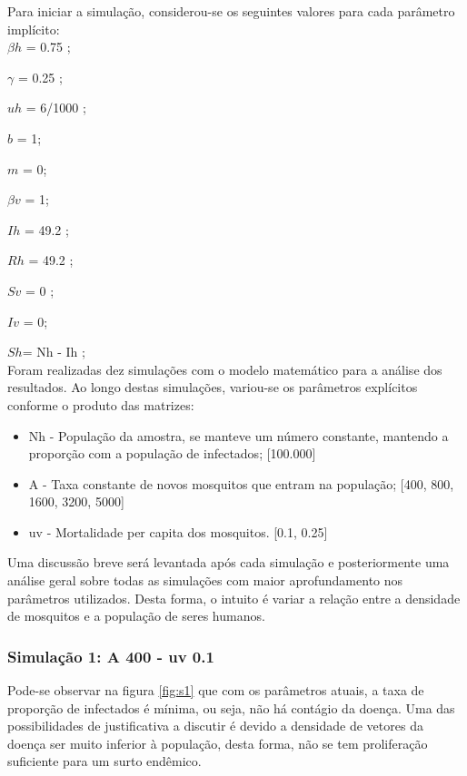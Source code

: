 \documentclass[conference]{IEEEtran}
\begin{document}
Para iniciar a simulação, considerou-se os seguintes valores para cada parâmetro implícito:\\

$ \beta h $ = 0.75 ;

$
 \gamma$ = 0.25 ;
 
$
uh $ = 6/1000 ;

$b$ = 1;

$ m$ = 0;

$ \beta v$ = 1;

$ Ih $ = 49.2 ;

$Rh$ = 49.2 ;

$Sv$ = 0 ;

$Iv$ = 0;
 
$Sh$= Nh - Ih ;\\

Foram realizadas dez simulações com o modelo matemático para a análise dos resultados. Ao longo destas simulações, variou-se os parâmetros explícitos conforme o produto das matrizes:\\

\begin{itemize}
    \item Nh - População da amostra, se manteve um número constante, mantendo a proporção com a população de infectados\cite{svs}; [100.000]
    \item A  - Taxa constante de novos mosquitos que entram na população; [400, 800, 1600, 3200, 5000]
    \item uv - Mortalidade per capita dos mosquitos. [0.1,  0.25]
\end{itemize}

Uma discussão breve será levantada após cada simulação e posteriormente uma análise geral sobre todas as simulações com maior aprofundamento nos parâmetros utilizados. Desta forma, o intuito é variar a relação entre a densidade de mosquitos e a população de seres humanos. \\[0.15 cm]

\subsubsection{Simulação 1: A 400 - uv 0.1}

Pode-se observar na figura \ref{fig:s1} que com os parâmetros atuais, a taxa de proporção de infectados é mínima, ou seja, não há contágio da doença. Uma das possibilidades de justificativa a discutir é devido a densidade de vetores da doença ser muito inferior à população, desta forma, não se tem proliferação suficiente para um surto endêmico.\\
\end{document}
